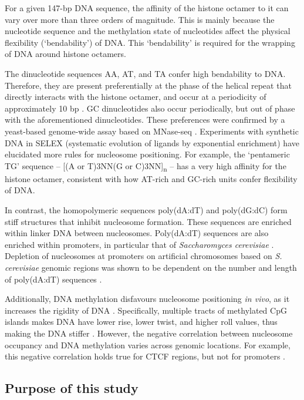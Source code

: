 \documentclass[a4paper, numbers=noenddot]{scrbook}
\begin{document}
For a given 147-bp DNA sequence, the affinity of the histone octamer to it can vary over more than three orders of magnitude.  This is mainly because the nucleotide sequence and the methylation state of nucleotides affect the physical flexibility (`bendability') of DNA.  This `bendability' is required for the wrapping of DNA around histone octamers.

The dinucleotide sequences AA, AT, and TA confer high bendability to DNA.  Therefore, they are present preferentially at the phase of the helical repeat that directly interacts with the histone octamer, and occur at a periodicity of approximately 10 bp \citep{struhl_determinants_2013}.  GC dinucleotides also occur periodically, but out of phase with the aforementioned dinucleotides.  These preferences were confirmed by a yeast-based genome-wide assay based on MNase-seq \citep{segal_genomic_2006}.  Experiments with synthetic DNA in SELEX (systematic evolution of ligands by exponential enrichment) \citep{lowary_new_1998} have elucidated more rules for nucleosome positioning.  For example, the `pentameric TG' sequence -- [(A or T)3NN(G or C)3NN]\textsubscript{n} -- has a very high affinity for the histone octamer, consistent with how AT-rich and GC-rich units confer flexibility of DNA.

In contrast, the homopolymeric sequences poly(dA:dT) and poly(dG:dC) form stiff structures that inhibit nucleosome formation.  These sequences are enriched within linker DNA between nucleosomes.  Poly(dA:dT) sequences are also enriched within promoters, in particular that of \emph{Saccharomyces cerevisiae} \citep{struhl_determinants_2013}.  Depletion of nucleosomes at promoters on artificial chromosomes based on \emph{S. cerevisiae} genomic regions was shown to be dependent on the number and length of poly(dA:dT) sequences \citep{hughes_functional_2012}.

Additionally, DNA methylation disfavours nucleosome positioning \emph{in vivo}, as it increases the rigidity of DNA \citep{huff_dnmt1-independent_2014}.  Specifically, multiple tracts of methylated CpG islands makes DNA have lower rise, lower twist, and higher roll values, thus making the DNA stiffer \citep{rao_systematic_2018, perez_impact_2012}.  However, the negative correlation between nucleosome occupancy and DNA methylation varies across genomic locations.  For example, this negative correlation holds true for CTCF regions, but not for promoters \citep{kelly_genome-wide_2012}.

\subsection{Purpose of this study}
\label{ssec:emsaselex_intro_why}
\end{document}

